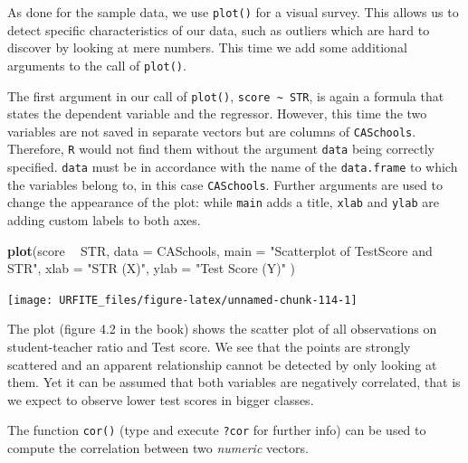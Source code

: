 \documentclass[]{book}
\newenvironment{Shaded}{\begin{snugshade}}{\end{snugshade}}
\newcommand{\KeywordTok}[1]{\textcolor[rgb]{0.13,0.29,0.53}{\textbf{#1}}}
\newcommand{\DataTypeTok}[1]{\textcolor[rgb]{0.13,0.29,0.53}{#1}}
\newcommand{\StringTok}[1]{\textcolor[rgb]{0.31,0.60,0.02}{#1}}
\newcommand{\OperatorTok}[1]{\textcolor[rgb]{0.81,0.36,0.00}{\textbf{#1}}}
\newcommand{\NormalTok}[1]{#1}
\theoremstyle{definition}
\theoremstyle{definition}
\theoremstyle{definition}
\theoremstyle{remark}
\begin{document}
As done for the sample data, we use \texttt{plot()} for a visual survey.
This allows us to detect specific characteristics of our data, such as
outliers which are hard to discover by looking at mere numbers. This
time we add some additional arguments to the call of \texttt{plot()}.

The first argument in our call of \texttt{plot()},
\texttt{score \textasciitilde{} STR}, is again a formula that states the
dependent variable and the regressor. However, this time the two
variables are not saved in separate vectors but are columns of
\texttt{CASchools}. Therefore, \texttt{R} would not find them without
the argument \texttt{data} being correctly specified. \texttt{data} must
be in accordance with the name of the \texttt{data.frame} to which the
variables belong to, in this case \texttt{CASchools}. Further arguments
are used to change the appearance of the plot: while \texttt{main} adds
a title, \texttt{xlab} and \texttt{ylab} are adding custom labels to
both axes.

\begin{Shaded}
\begin{Highlighting}[]
\KeywordTok{plot}\NormalTok{(score }\OperatorTok{~}\StringTok{ }\NormalTok{STR, }
     \DataTypeTok{data =}\NormalTok{ CASchools,}
     \DataTypeTok{main =} \StringTok{"Scatterplot of TestScore and STR"}\NormalTok{, }
     \DataTypeTok{xlab =} \StringTok{"STR (X)"}\NormalTok{,}
     \DataTypeTok{ylab =} \StringTok{"Test Score (Y)"}
\NormalTok{)}
\end{Highlighting}
\end{Shaded}

\begin{center}\texttt{[image: URFITE\_files/figure-latex/unnamed-chunk-114-1]} \end{center}

The plot (figure 4.2 in the book) shows the scatter plot of all
observations on student-teacher ratio and Test score. We see that the
points are strongly scattered and an apparent relationship cannot be
detected by only looking at them. Yet it can be assumed that both
variables are negatively correlated, that is we expect to observe lower
test scores in bigger classes.

The function \texttt{cor()} (type and execute \texttt{?cor} for further
info) can be used to compute the correlation between two \emph{numeric}
vectors.

\begin{Shaded}
\end{Shaded}
\end{document}
